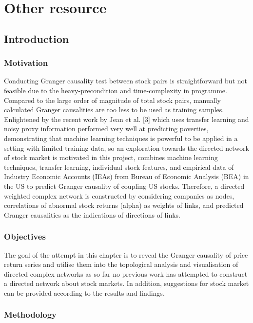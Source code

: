 \chapter{Other resource}
\label{cpt:other}
\section{Introduction}
\subsection{Motivation}
Conducting Granger causality test between stock pairs is straightforward but not feasible due to the heavy-precondition and time-complexity in programme. Compared to the large order of magnitude of total stock pairs, manually calculated Granger causalities are too less to be used as training samples. Enlightened by the recent work by Jean et al. [3] which uses transfer learning and noisy proxy information performed very well at predicting poverties, demonstrating that machine learning techniques is powerful to be applied in a setting with limited training data, so an exploration towards the directed network of stock market is motivated in this project, combines machine learning techniques, transfer learning, individual stock features, and empirical data of Industry Economic Accounts (IEAs) from Bureau of Economic Analysis (BEA) in the US to predict Granger causality of coupling US stocks. Therefore, a directed weighted complex network is constructed by considering companies as nodes, correlations of abnormal stock returns (alpha) as weights of links, and predicted Granger causalities as the indications of directions of links.

\subsection{Objectives}
The goal of the attempt in this chapter is to reveal the Granger causality of price return series and utilise them into the topological analysis and visualisation of directed complex networks as so far no previous work has attempted to construct a directed network about stock markets. In addition, suggestions for stock market can be provided according to the results and findings.

\subsection{Methodology}


